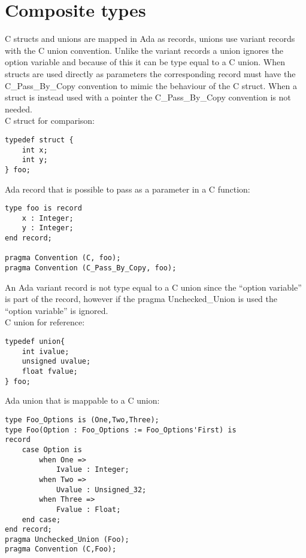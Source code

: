 \section{Composite types}
C structs and unions are mapped in Ada as records, unions use variant records with the C union convention. Unlike the variant records a union ignores the option variable and because of this it can be type equal to a C union.
When structs are used directly as parameters the corresponding record must have the C_Pass_By_Copy convention to mimic the behaviour of the C struct. When a struct is instead used with a pointer the C_Pass_By_Copy convention is not needed.
\\
C struct for comparison: 
\begin{lstlisting}
typedef struct {
	int x;
	int y;
} foo;
\end{lstlisting}
Ada record that is possible to pass as a parameter in a C function:
\begin{lstlisting}
type foo is record
	x : Integer;
	y : Integer;
end record;

pragma Convention (C, foo);
pragma Convention (C_Pass_By_Copy, foo);
\end{lstlisting}
An Ada variant record is not type equal to a C union since the ``option variable'' is part of the record, however if the pragma Unchecked_Union\cite{ununion} is used the ``option variable'' is ignored.
\\
C union for reference:
\begin{lstlisting}
typedef union{
	int ivalue;
	unsigned uvalue;
	float fvalue;
} foo;
\end{lstlisting}
Ada union that is mappable to a C union:
\begin{lstlisting}
type Foo_Options is (One,Two,Three);
type Foo(Option : Foo_Options := Foo_Options'First) is 
record
	case Option is
		when One =>
			Ivalue : Integer;
		when Two =>
			Uvalue : Unsigned_32;
		when Three =>
			Fvalue : Float;
	end case;
end record;
pragma Unchecked_Union (Foo);
pragma Convention (C,Foo);
\end{lstlisting}
